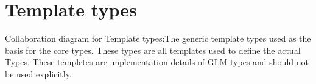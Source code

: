 \hypertarget{group__core__template}{
\section{Template types}
\label{group__core__template}
}


Collaboration diagram for Template types:The generic template types used as the basis for the core types.  
These types are all templates used to define the actual \hyperlink{group__core__types}{Types}. These templetes are implementation details of GLM types and should not be used explicitly. 